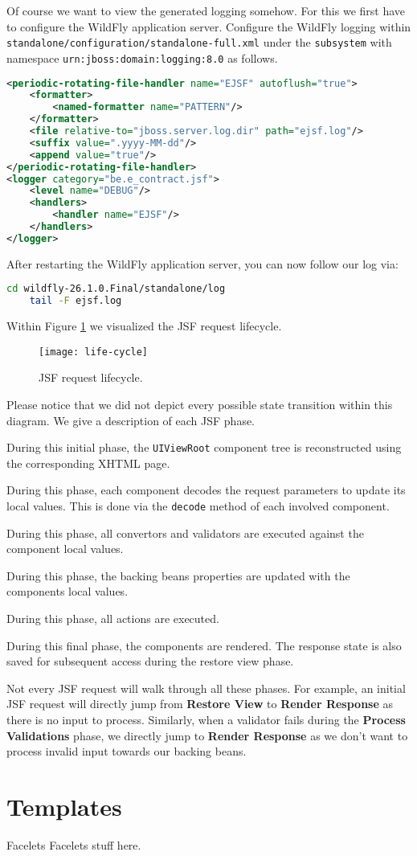 Of course we want to view the generated logging somehow.
For this we first have to configure the WildFly application server.
Configure the WildFly logging within \texttt{standalone/configuration/standalone-full.xml} under the \texttt{subsystem} with namespace \texttt{urn:jboss:domain:logging:8.0} as follows.
\begin{lstlisting}[language=XML]
<periodic-rotating-file-handler name="EJSF" autoflush="true">
	<formatter>
		<named-formatter name="PATTERN"/>
	</formatter>
	<file relative-to="jboss.server.log.dir" path="ejsf.log"/>
	<suffix value=".yyyy-MM-dd"/>
	<append value="true"/>
</periodic-rotating-file-handler>
<logger category="be.e_contract.jsf">
	<level name="DEBUG"/>
	<handlers>
		<handler name="EJSF"/>
	</handlers>
</logger>
\end{lstlisting}
After restarting the WildFly application server, you can now follow our log via:
\begin{lstlisting}[language=bash]
	cd wildfly-26.1.0.Final/standalone/log
	tail -F ejsf.log
\end{lstlisting}
Within Figure \ref{fig:life-cycle} we visualized the JSF request lifecycle.
\begin{figure}[htbp]
	\begin{center}
		\texttt{[image: life-cycle]}
		\caption{JSF request lifecycle.}
		\label{fig:life-cycle}
	\end{center}
\end{figure}
Please notice that we did not depict every possible state transition within this diagram.
We give a description of each JSF phase.
\begin{description}[style=nextline]
	\item[Restore View]
	During this initial phase, the \texttt{UIViewRoot} component tree is reconstructed using the corresponding XHTML page.
	\item[Apply Request Values]
	During this phase, each component decodes the request parameters to update its local values.
	This is done via the \texttt{decode} method of each involved component.
	\item[Process Validations]
	During this phase, all convertors and validators are executed against the component local values.
	\item[Update Model Values]
	During this phase, the backing beans properties are updated with the components local values.
	\item[Invoke Application]
	During this phase, all actions are executed.
	\item[Render Response]
	During this final phase, the components are rendered.
	The response state is also saved for subsequent access during the restore view phase.
\end{description}
Not every JSF request will walk through all these phases. For example, an initial JSF request will directly jump from \textbf{Restore View} to \textbf{Render Response} as there is no input to process.
Similarly, when a validator fails during the \textbf{Process Validations} phase, we directly jump to \textbf{Render Response} as we don't want to process invalid input towards our backing beans.

\section{Templates}
\begin{TODO}{Facelets}
Facelets stuff here.
\end{TODO}
